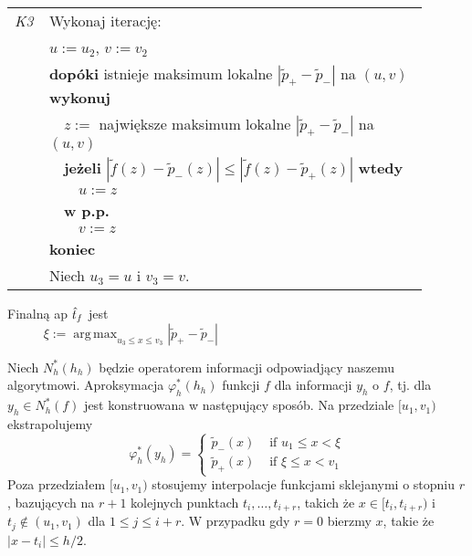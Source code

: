 \documentclass[oik, pdftex, robocza, man]{mgrwms}
\DeclareMathOperator*{\argmax}{arg\,max}
\begin{document}
\begin{tabular}{p{0.045\linewidth} p{0.85\linewidth}}
        \textit{K3} & Wykonaj iterację: \\
                        & $u := u_2$, $v := v_2$ \\
                        & \textbf{dopóki} istnieje maksimum lokalne $|\tilde{p}_{+} - \tilde{p}_{-}|$ na $(u,v)$ \textbf{wykonuj} \\
                        & $\quad$$z :=$ największe maksimum lokalne $|\tilde{p}_{+} - \tilde{p}_{-}|$ na $(u,v)$ \\
                        & $\quad$\textbf{jeżeli} $|\tilde{f}(z) - \tilde{p}_{-}(z)| \leq |\tilde{f}(z) - \tilde{p}_{+}(z)|$ \textbf{wtedy} \\
                        & $\quad\quad$$u:= z$ \\
                        & $\quad$\textbf{w p.p.} \\
                        & $\quad\quad$$v:= z$ \\
                        & \textbf{koniec} \\
                        & Niech $u_3 = u$ i $v_3 = v$.
    \end{tabular} \vspace{10pt}

    Finalną ap $\hat{t}_f$ jest
    \begin{equation*}
            \xi := \argmax_{u_3 \leq x \leq v_3}|\tilde{p}_{+} - \tilde{p}_{-}| \hspace{200pt}
    \end{equation*}

    Niech $N_{h}^{*}(h_{h})$ będzie operatorem informacji odpowiadjący naszemu algorytmowi. Aproksymacja $\varphi_{h}^{*}(h_{h})$ funkcji $f$ dla informacji $y_{h}$ o $f$, tj. dla $y_{h} \in N_{h}^{*}(f)$ jest konstruowana w następujący sposób. Na przedziale $[u_{1}, v_{1})$ ekstrapolujemy
    \begin{equation*}
        \varphi_{h}^{*}\left(y_{h}\right)= \begin{cases}
            \tilde{p}_{-}(x) & \text { if } u_{1} \leq x<\xi \\ 
            \tilde{p}_{+}(x) & \text { if } \xi \leq x<v_{1}\end{cases}
    \end{equation*}
    Poza przedziałem $[u_{1}, v_{1})$ stosujemy interpolacje funkcjami sklejanymi o stopniu $r$, bazujących na $r+1$ kolejnych punktach $t_{i}, \ldots, t_{i+r}$, takich że $x \in [t_{i},t_{i+r})$ i $t_{j} \notin (u_{1},v_{1})$ dla $1 \leq j \leq i+r$. W przypadku gdy $r=0$ bierzmy $x$, takie że $|x-t_{i}| \leq h/2$.
\end{document}
